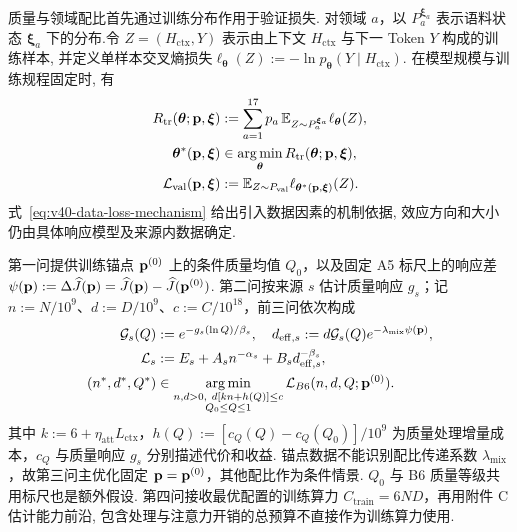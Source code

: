 质量与领域配比首先通过训练分布作用于验证损失. 对领域 $a$，以 $P_a^{\boldsymbol\xi_a}$ 表示语料状态 $\boldsymbol\xi_a$ 下的分布.令 $Z=(H_{\mathrm{ctx}},Y)$ 表示由上下文 $H_{\mathrm{ctx}}$ 与下一 Token $Y$ 构成的训练样本, 并定义单样本交叉熵损失$\ell_{\boldsymbol\theta}(Z):=-\ln p_{\boldsymbol\theta}(Y\mid H_{\mathrm{ctx}})$. 在模型规模与训练规程固定时, 有
\begin{subequations}\label{eq:v40-data-loss-mechanism}
\begin{align}
R_{\mathrm{tr}}(\boldsymbol\theta;\mathbf p,\boldsymbol\xi)
&:=\sum_{a=1}^{17}p_a\,\mathbb E_{Z\sim P_a^{\boldsymbol\xi_a}}\ell_{\boldsymbol\theta}(Z),\\
\boldsymbol\theta^*(\mathbf p,\boldsymbol\xi)
&\in\operatorname*{arg\,min}_{\boldsymbol\theta}R_{\mathrm{tr}}(\boldsymbol\theta;\mathbf p,\boldsymbol\xi),\\
\mathcal L_{\mathrm{val}}(\mathbf p,\boldsymbol\xi)
&:=\mathbb E_{Z\sim P_{\mathrm{val}}}\ell_{\boldsymbol\theta^*(\mathbf p,\boldsymbol\xi)}(Z).
\end{align}
\end{subequations}
式~\eqref{eq:v40-data-loss-mechanism} 给出引入数据因素的机制依据, 效应方向和大小仍由具体响应模型及来源内数据确定. 

第一问提供训练锚点 $\mathbf p^{(0)}$ 上的条件质量均值 $Q_0$，以及固定 A5 标尺上的响应差 $\psi(\mathbf p):=\Delta\widehat J(\mathbf p)=\widehat J(\mathbf p)-\widehat J(\mathbf p^{(0)})$. 第二问按来源 $s$ 估计质量响应 $g_s$；记 $n:=N/10^9$、$d:=D/10^9$、$c:=C/10^{18}$，前三问依次构成
\begin{subequations}\label{eq:unified-chain-v9}
    \begin{align}
\mathcal G_s(Q)&:=e^{-g_s(\ln Q)/\beta_s},\quad
d_{\mathrm{eff},s}:=d\mathcal G_s(Q)e^{-\lambda_{\mathrm{mix}}\psi(\mathbf p)},\\
\mathcal L_s&:=E_s+A_sn^{-\alpha_s}+B_sd_{\mathrm{eff},s}^{-\beta_s},\\
(n^*,d^*,Q^*)&\in\operatorname*{arg\,min}_{\substack{n,d>0,\ d[kn+h(Q)]\le c\\Q_0\le Q\le1}}
\mathcal L_{B6}(n,d,Q;\mathbf p^{(0)}).
\end{align}
\end{subequations}
其中 $k:=6+\eta_{\mathrm{att}}L_{\mathrm{ctx}}$，$h(Q):=[c_Q(Q)-c_Q(Q_0)]/10^9$ 为质量处理增量成本，$c_Q$ 与质量响应 $g_s$ 分别描述代价和收益. 锚点数据不能识别配比传递系数 $\lambda_{\mathrm{mix}}$，故第三问主优化固定 $\mathbf p=\mathbf p^{(0)}$，其他配比作为条件情景. $Q_0$ 与 B6 质量等级共用标尺也是额外假设. 第四问接收最优配置的训练算力 $C_{\mathrm{train}}=6ND$，再用附件 C 估计能力前沿, 包含处理与注意力开销的总预算不直接作为训练算力使用. 

